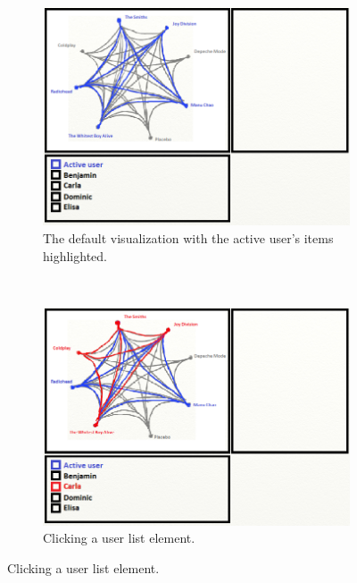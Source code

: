 \documentclass[a4paper,10pt,twocolumn]{article}
\begin{document}
\begin{appendices}
  
	\begin{figure}
		\centering
		\begin{subfigure}[t]{0.3\textwidth}
						\centering
						\includegraphics[width=\textwidth]{img/paper_prototype_default}
						\caption{The default visualization with the active user's items highlighted.}
						\label{figure:paper_prototype_default}
		\end{subfigure}%
		~
		\begin{subfigure}[t]{0.3\textwidth}
						\centering
						\includegraphics[width=\textwidth]{img/paper_prototype_user_click}
						\caption{Clicking a user list element.}
						\label{figure:paper_prototype_user_click}
		\end{subfigure}

\end{figure}
\end{appendices}
\end{document}
